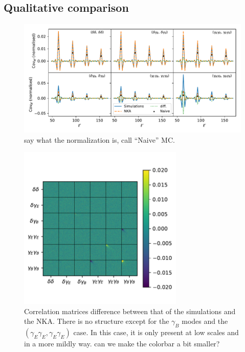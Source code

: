 \documentclass[a4paper,11pt]{article}
\newcommand{\red}[1]{{\color{red} #1}}
\begin{document}
    \subsection{Qualitative comparison}\label{ssec:results.visual}
      \begin{figure}
        \centering
        \includegraphics[width=\textwidth]{./figures/all_rows_sph_1bin.pdf}
        \caption{\red{say what the normalization is, call ``Naive'' MC.}} \label{fig:rows_1bin}
      \end{figure}
      \begin{figure}
        \centering
        \includegraphics[width=0.7\textwidth]{./figures/sph_1bin_diff_corr.pdf}
        \caption{Correlation matrices difference between that of the simulations and the NKA. There is no structure except for the $\gamma_B$ modes and the $(\gamma_E\gamma_E, \gamma_E\gamma_E)$ case. In this case, it is only present at low scales and in a more mildly way. \red{can we make the colorbar a bit smaller?}} \label{fig:diff_corr_1bin}
      \end{figure}
\end{document}
